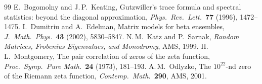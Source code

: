 \documentclass[11pt,a4paper]{article}
\begin{document}
\begin{thebibliography}{99}
 E.~Bogomolny and J.\,P.~Keating, Gutzwiller's trace formula and spectral statistics: beyond the diagonal approximation, \emph{Phys.\ Rev.\ Lett.}\ \textbf{77} (1996), 1472--1475.
 I.~Dumitriu and A.~Edelman, Matrix models for beta ensembles, \emph{J.\ Math.\ Phys.}\ \textbf{43} (2002), 5830--5847.
 N.\,M.~Katz and P.~Sarnak, \emph{Random Matrices, Frobenius Eigenvalues, and Monodromy}, AMS, 1999.
 H.\,L.~Montgomery, The pair correlation of zeros of the zeta function, \emph{Proc.\ Symp.\ Pure Math.}\ \textbf{24} (1973), 181--193.
 A.\,M.~Odlyzko, The $10^{22}$-nd zero of the Riemann zeta function, \emph{Contemp.\ Math.}\ \textbf{290}, AMS, 2001.
\end{thebibliography}
\end{document}
